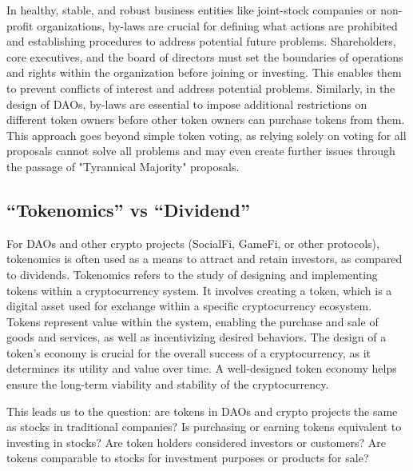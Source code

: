 \documentclass[main.tex]{subfiles}
\begin{document}
In healthy, stable, and robust business entities like joint-stock companies or non-profit organizations, by-laws are crucial for defining what actions are prohibited and establishing procedures to address potential future problems. Shareholders, core executives, and the board of directors must set the boundaries of operations and rights within the organization before joining or investing. This enables them to prevent conflicts of interest and address potential problems. Similarly, in the design of DAOs, by-laws are essential to impose additional restrictions on different token owners before other token owners can purchase tokens from them. This approach goes beyond simple token voting, as relying solely on voting for all proposals cannot solve all problems and may even create further issues through the passage of "Tyrannical Majority" proposals.

\subsection{``Tokenomics'' vs ``Dividend''}

For DAOs and other crypto projects (SocialFi, GameFi, or other protocols), tokenomics is often used as a means to attract and retain investors, as compared to dividends. Tokenomics refers to the study of designing and implementing tokens within a cryptocurrency system. It involves creating a token, which is a digital asset used for exchange within a specific cryptocurrency ecosystem. Tokens represent value within the system, enabling the purchase and sale of goods and services, as well as incentivizing desired behaviors. The design of a token's economy is crucial for the overall success of a cryptocurrency, as it determines its utility and value over time. A well-designed token economy helps ensure the long-term viability and stability of the cryptocurrency.

This leads us to the question: are tokens in DAOs and crypto projects the same as stocks in traditional companies? Is purchasing or earning tokens equivalent to investing in stocks? Are token holders considered investors or customers? Are tokens comparable to stocks for investment purposes or products for sale?
\end{document}
